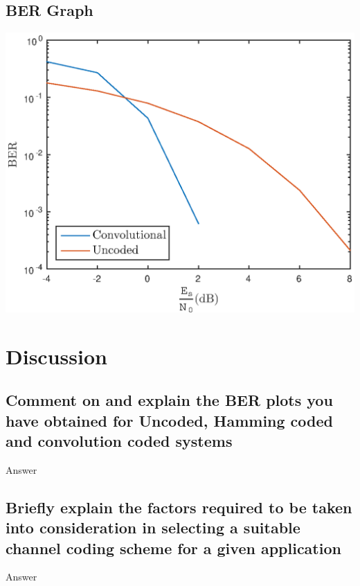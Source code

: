 \documentclass[11pt]{article}
\begin{document}
\subsection{BER Graph}
\begin{center}
    \includegraphics[width=.5\textwidth]{q613.eps}
    \label{fig:q613}
\end{center}


\section{Discussion}
\subsection{Comment on and explain the BER plots you have obtained for Uncoded, Hamming coded and
convolution coded systems}
Answer
\subsection{Briefly explain the factors required to be taken into consideration in selecting a suitable
channel coding scheme for a given application}
Answer


\end{document}
